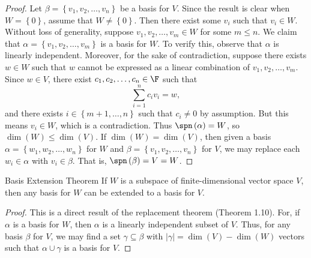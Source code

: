 \documentclass[linearalgebraI]{subfiles}
\begin{document}
    \begin{proof}
        Let $\beta=\left\lbrace v_1,v_2,\ldots,v_n \right\rbrace$ be a basis for $V$. Since the result is clear when $W=\left\lbrace 0 \right\rbrace $, assume that $W\neq \left\lbrace 0 \right\rbrace$. Then there exist some $v_i$ such that $v_i\in W$. Without loss of generality, suppose $v_1,v_2,\ldots,v_m\in W$ for some $m\leq n$. We claim that $\alpha=\left\lbrace v_1,v_2,\ldots,v_m \right\rbrace$ is a basis for $W$. To verify this, observe that $\alpha$ is linearly independent. Moreover, for the sake of contradiction, suppose there exists $w\in W$ such that $w$ cannot be expressed as a linear combination of $v_1,v_2,\ldots,v_m$. Since $w\in V$, there exist $c_1,c_2,\ldots,c_n\in\F$ such that
        \begin{equation*}
            \sum^{n}_{i=1} c_iv_i = w,
        \end{equation*}
        and there exists $i\in\left\lbrace m+1,\ldots,n \right\rbrace$ such that $c_i\neq 0$ by assumption. But this means $v_i\in W$, which is a contradiction. Thus $\spn\left( \alpha \right) = W$, so $\dim(W)\leq\dim(V)$. If $\dim(W)=\dim(V)$, then given a basis $\alpha = \left\lbrace w_1,w_2,\ldots,w_n \right\rbrace$ for $W$ and $\beta = \left\lbrace v_1,v_2,\ldots,v_n \right\rbrace$ for $V$, we may replace each $w_i\in\alpha$ with $v_i\in\beta$. That is, $\spn\left( \beta \right) = V = W$.
    \end{proof}

    \begin{theorem}{Basis Extension Theorem}
        If $W$ is a subspace of finite-dimensional vector space $V$, then any basis for $W$ can be extended to a basis for $V$.
    \end{theorem}

    \begin{proof}
        This is a direct result of the replacement theorem (Theorem 1.10). For, if $\alpha$ is a basis for $W$, then $\alpha$ is a linearly independent subset of $V$. Thus, for any basis $\beta$ for $V$, we may find a set $\gamma\subseteq\beta$ with $\left| \gamma \right| = \dim\left( V \right) - \dim\left( W \right)$ vectors such that $\alpha\cup\gamma$ is a basis for $V$.
    \end{proof}
\end{document}
